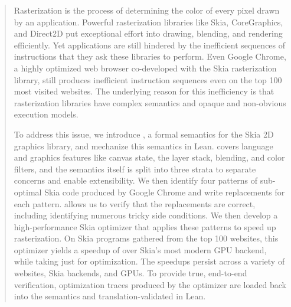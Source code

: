 \documentclass[main.tex]{subfiles}
\begin{document}
\begin{abstract}
Rasterization is the process of determining
  the color of every pixel drawn by an application.
Powerful rasterization libraries
  like Skia, CoreGraphics, and Direct2D
  put exceptional effort into drawing, blending, and rendering efficiently.
Yet applications are still hindered
  by the inefficient sequences of instructions
  that they ask these libraries to perform.
Even Google Chrome, a highly optimized web browser
  co-developed with the Skia rasterization library,
  still produces inefficient instruction sequences
  even on the top 100 most visited websites.
The underlying reason for this inefficiency
  is that rasterization libraries have complex semantics
  and opaque and non-obvious execution models.

To address this issue, we introduce \muskia,
  a formal semantics for the Skia 2D graphics library,
  and mechanize this semantics in Lean.
\muskia covers language and graphics features
  like canvas state, the layer stack, blending, and color filters,
  and the semantics itself is split into three strata
  to separate concerns and enable extensibility.
We then identify four patterns
  of sub-optimal Skia code produced by Google Chrome
  and write replacements for each pattern.
\muskia allows us to verify that the replacements are correct,
  including identifying numerous tricky side conditions.
We then develop a high-performance Skia optimizer
  that applies these patterns to speed up rasterization.
On \graphiteAppleNumBench Skia programs
  gathered from the top 100 websites,
  this optimizer yields a speedup of \graphiteAppleGeoSpeedup
  over Skia's most modern GPU backend,
  while taking just \graphiteAppleMaxOptTime for optimization.
The speedups persist across a variety of
  websites, Skia backends, and GPUs.
To provide true, end-to-end verification,
  optimization traces produced by the optimizer
  are loaded back into the \muskia semantics and translation-validated in Lean.
\end{abstract}
\end{document}
